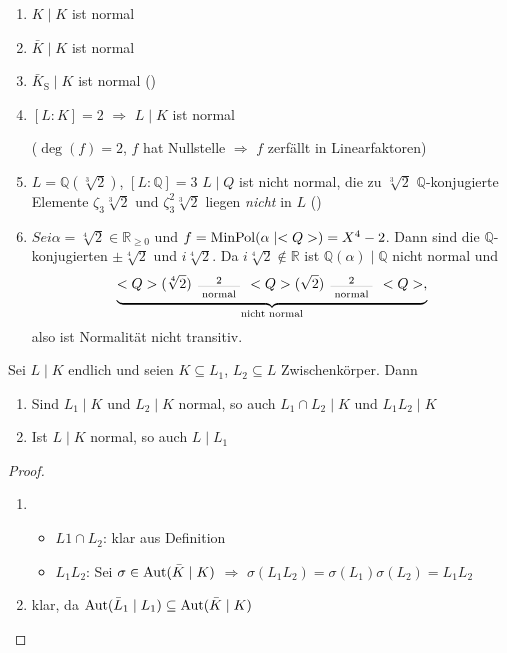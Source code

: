 \begin{example}
	\begin{enumerate}[label={\alph*)}]
		\item $K\mid K$ ist normal
		\item $\bar K\mid K$ ist normal
		\item $\bar K_{\mathrm S} \mid K$ ist normal ()
		\item $[L:K] = 2$ $\Rightarrow$ $L\mid K$ ist normal
		
		($\deg(f) = 2$, $f$ hat Nullstelle $\Rightarrow$ $f$ zerfällt in Linearfaktoren)
		\item $L = \mathbb Q(\sqrt[3]2)$, $[L:\mathbb Q] = 3$ $L\mid Q$ ist nicht normal, die zu $\sqrt[3]2$ $\mathbb Q$-konjugierte Elemente $\zeta_3 \sqrt[3]2$ und $\zeta_3^2 \sqrt[3]2$ liegen \emph{nicht} in $L$ ()
		\item $Sei \alpha = \sqrt[4]2\in\mathbb R_{\ge 0}$  und $f = \operatorname{MinPol}(\alpha\mid<Q>) = X^4 - 2$. Dann sind die $\mathbb Q$-konjugierten $\pm \sqrt[4]2$ und $i\sqrt[4]2$. Da $i\sqrt[4]2\notin\mathbb R$ ist $\mathbb Q(\alpha)\mid \mathbb Q$ nicht normal und \begin{equation*}
			\underbrace{\mathbb Q(\sqrt[4]2) \;\, \underset{\text{normal}}{\overset{2}{\rule[0.1\baselineskip]{3em}{0.1pt}}} \;\, \mathbb  Q(\sqrt 2) \;\, \underset{\text{normal}}{\overset{2}{\rule[0.1\baselineskip]{3em}{0.1pt}}} \;\, \mathbb Q,}_{\text{nicht normal}}
		\end{equation*}
		also ist Normalität nicht transitiv.
	\end{enumerate}
\end{example}

\begin{conclusion}
	Sei $L\mid K$ endlich und seien $K\subseteq L_1$, $L_2\subseteq L$ Zwischenkörper. Dann \begin{enumerate}[label={(\alph*)}]
		\item Sind $L_1\mid K$ und $L_2\mid K$ normal, so auch $L_1\cap L_2\mid K$ und $L_1L_2 \mid K$
		\item Ist $L\mid K$ normal, so auch $L\mid L_1$
	\end{enumerate}
\end{conclusion}

\begin{proof}\leavevmode
\begin{enumerate}[label={\alph*)},topsep=-6pt]
	\item \begin{itemize}[left=0pt]
		\item $L1\cap L_2$: klar aus Definition
		\item $L_1L_2$: Sei $\sigma\in\operatorname{Aut}(\bar K\mid K)$ $\Rightarrow$ $\sigma(L_1L_2)  = \sigma(L_1)\sigma(L_2) = L_1 L_2$
	\end{itemize}
	\item klar, da $\operatorname{Aut}(\bar L_1\mid L_1)\subseteq \operatorname{Aut}(\bar K\mid K)$
\end{enumerate}
\end{proof}

